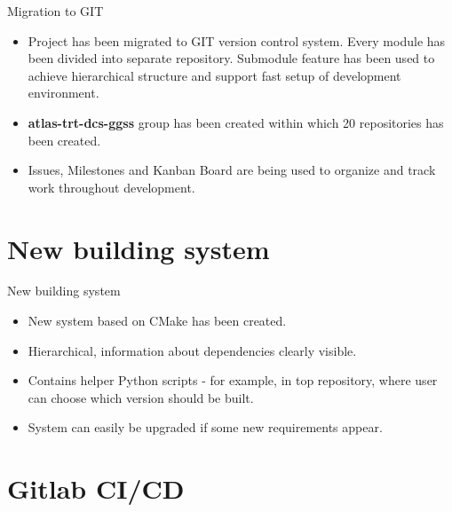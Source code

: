 \documentclass[10pt]{beamer}
\begin{document}
\begin{frame}{Migration to GIT}
\begin{itemize}
	\item Project has been migrated to GIT version control system. Every module has been divided into separate repository. Submodule feature has been used to achieve hierarchical structure and support fast setup of development environment.
	\item \textbf{atlas-trt-dcs-ggss} group has been created within which 20 repositories has been created.
	\item Issues, Milestones and Kanban Board are being used to organize and track work throughout development.
\end{itemize}
\end{frame}


\section {New building system}

\begin{frame}{New building system}
\begin{itemize}
  \item New system based on CMake has been created.
  \item Hierarchical, information about dependencies clearly visible.
  \item Contains helper Python scripts - for example, in top repository, where user can choose which version should be built.
  \item System can easily be upgraded if some new requirements appear.
\end{itemize}
\end{frame}


\section {Gitlab CI/CD}
\end{document}
